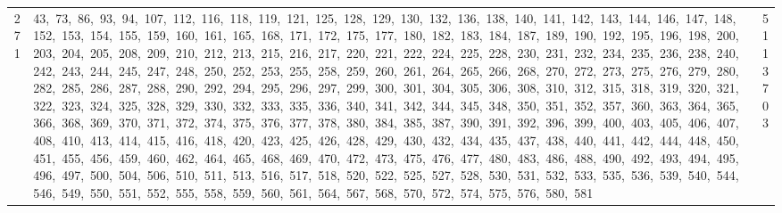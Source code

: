 \begin{longtable}{c|p{}|r}
271 & 43,\ 73,\ 86,\ 93,\ 94,\ 107,\ 112,\ 116,\ 118,\ 119,\ 121,\ 125,\ 128,\ 129,\ 130,\ 132,\ 136,\ 138,\ 140,\ 141,\ 142,\ 143,\ 144,\ 146,\ 147,\ 148,\ 152,\ 153,\ 154,\ 155,\ 159,\ 160,\ 161,\ 165,\ 168,\ 171,\ 172,\ 175,\ 177,\ 180,\ 182,\ 183,\ 184,\ 187,\ 189,\ 190,\ 192,\ 195,\ 196,\ 198,\ 200,\ 203,\ 204,\ 205,\ 208,\ 209,\ 210,\ 212,\ 213,\ 215,\ 216,\ 217,\ 220,\ 221,\ 222,\ 224,\ 225,\ 228,\ 230,\ 231,\ 232,\ 234,\ 235,\ 236,\ 238,\ 240,\ 242,\ 243,\ 244,\ 245,\ 247,\ 248,\ 250,\ 252,\ 253,\ 255,\ 258,\ 259,\ 260,\ 261,\ 264,\ 265,\ 266,\ 268,\ 270,\ 272,\ 273,\ 275,\ 276,\ 279,\ 280,\ 282,\ 285,\ 286,\ 287,\ 288,\ 290,\ 292,\ 294,\ 295,\ 296,\ 297,\ 299,\ 300,\ 301,\ 304,\ 305,\ 306,\ 308,\ 310,\ 312,\ 315,\ 318,\ 319,\ 320,\ 321,\ 322,\ 323,\ 324,\ 325,\ 328,\ 329,\ 330,\ 332,\ 333,\ 335,\ 336,\ 340,\ 341,\ 342,\ 344,\ 345,\ 348,\ 350,\ 351,\ 352,\ 357,\ 360,\ 363,\ 364,\ 365,\ 366,\ 368,\ 369,\ 370,\ 371,\ 372,\ 374,\ 375,\ 376,\ 377,\ 378,\ 380,\ 384,\ 385,\ 387,\ 390,\ 391,\ 392,\ 396,\ 399,\ 400,\ 403,\ 405,\ 406,\ 407,\ 408,\ 410,\ 413,\ 414,\ 415,\ 416,\ 418,\ 420,\ 423,\ 425,\ 426,\ 428,\ 429,\ 430,\ 432,\ 434,\ 435,\ 437,\ 438,\ 440,\ 441,\ 442,\ 444,\ 448,\ 450,\ 451,\ 455,\ 456,\ 459,\ 460,\ 462,\ 464,\ 465,\ 468,\ 469,\ 470,\ 472,\ 473,\ 475,\ 476,\ 477,\ 480,\ 483,\ 486,\ 488,\ 490,\ 492,\ 493,\ 494,\ 495,\ 496,\ 497,\ 500,\ 504,\ 506,\ 510,\ 511,\ 513,\ 516,\ 517,\ 518,\ 520,\ 522,\ 525,\ 527,\ 528,\ 530,\ 531,\ 532,\ 533,\ 535,\ 536,\ 539,\ 540,\ 544,\ 546,\ 549,\ 550,\ 551,\ 552,\ 555,\ 558,\ 559,\ 560,\ 561,\ 564,\ 567,\ 568,\ 570,\ 572,\ 574,\ 575,\ 576,\ 580,\ 581 & 5113703 \\

\end{longtable}

